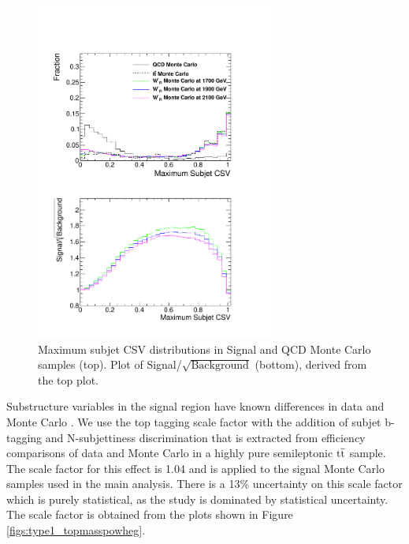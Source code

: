 \begin{figure}[htcb]
\begin{center}
\includegraphics[width=0.7\textwidth]{AN-13-004/figs/bmaxCompqcdandsignal.pdf}
\caption{
Maximum subjet CSV distributions in Signal and QCD Monte Carlo samples (top).  Plot of Signal/$\sqrt{\text{Background}}$ (bottom), derived from the top plot. 
}
\label{figs:BtagCOMP}
\end{center}
\end{figure}

Substructure variables in the signal region have known differences in data and Monte Carlo \cite{JME13007}.  
We use the top tagging scale factor with the addition of subjet b-tagging and N-subjettiness discrimination that is extracted 
from efficiency comparisons of data and Monte Carlo in a highly pure semileptonic $\mathrm{t\overline{t}}$ sample.   
The scale factor for this effect is 1.04 and is applied to the signal Monte Carlo samples used in the main analysis.  
There is a 13\% uncertainty on this scale factor which is purely statistical, as the study is dominated by statistical uncertainty.  
The scale factor is obtained from the plots shown in Figure \ref{figs:type1_topmasspowheg}.

